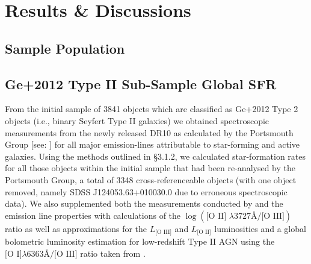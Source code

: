 \section{Results \& Discussions}
\subsection{Sample Population}
\subsection{Ge+2012 Type II Sub-Sample Global SFR}

From the initial sample of 3841 objects which are classified as Ge+2012 Type 2 objects (i.e., binary Seyfert Type II galaxies) we obtained spectroscopic measurements from the newly released DR10 as calculated by the Portsmouth Group [see: \cite{Thomas_2013}] for all major emission-lines attributable to star-forming and active galaxies. Using the methods outlined in §3.1.2, we calculated star-formation rates for all those objects within the initial sample that had been re-analysed by the Portsmouth Group, a total of 3348 cross-referenceable objects (with one object removed, namely SDSS J124053.63+010030.0 due to erroneous spectroscopic data). We also supplemented both the measurements conducted by \cite{Ge_Hu_Wang_Bai_Zhang_2012} and the emission line properties \cite{Thomas_2013} with calculations of the $\log{(\text{[O II] }{\lambda}3727Å\text{/[O III]})}$ ratio as well as approximations for the $L_{\text{[O III]}}$ and $L_{\text{[O II]}}$ luminosities and a global bolometric luminosity estimation for low-redshift Type II AGN using the $\text{[O I]}\lambda6363Å/\text{[O III]}$ ratio taken from \cite{Netzer_2009}.         

